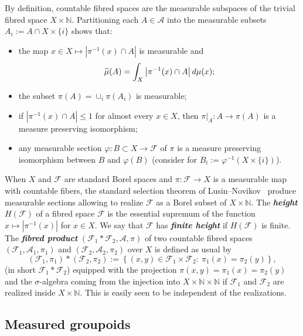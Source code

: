 \documentclass[AHL,Unicode,longabstracts,published]{cedram}
\newcommand{\defin}[1]{\textbf{\emph{#1}}}
\newcommand{\Nmath}{\mathbb{N}}
\newcommand{\cf}{\mathcal{F}}
\newcommand{\ra}{\mathscr{A}}
\newcommand{\ph}{\varphi}
\let\oldtilde\tilde
\renewcommand*{\tilde}[1]{\mathchoice{\widetilde{#1}}{\widetilde{#1}}{\oldtilde{#1}}{\oldtilde{#1}}}
\begin{document}
\begin{rema}\label{rem: count fibred sp. and measurab}
By definition, countable fibred spaces are the measurable subspaces of the trivial fibred space $X \times \Nmath$. Partitioning each $A \in \ra$ into the measurable subsets $A_i:=A\cap X\times\{i\}$ shows that:
\begin{itemize}
\item the map $x \in X\mapsto |\pi^{-1}(x) \cap A|$ is measurable and
\begin{equation}\label{eq: tilde mu on fibred}
\tilde\mu(A)=\int_X\left| \pi^{-1}(x)\cap A\right| d\mu(x);
\end{equation}
\item the subset $\pi(A)=\cup_i \pi(A_i)$ is measurable;
\item if $|\pi^{-1}(x)\cap A|\leq 1$ for almost every $x\in X$, then $\pi\bigr|_A:A\to \pi(A)$ is a measure preserving isomorphism;
\item any measurable section $\ph:B\subset X\to \cf$ of $\pi$ is a measure preserving isomorphism between $B$ and $\ph(B)$ (consider for $B_i:=\ph^{-1} (X\times \{i\})$).
\end{itemize}
\end{rema}


When $X$ and $\cf$ are standard Borel spaces and $\pi \colon \cf \to X$ is a measurable map with countable fibers, the standard selection theorem of Lusin--Novikov~\cite{Lusin-Novikoff-1935} produce measurable sections allowing to realize $\cf$ as a Borel subset of $X \times \Nmath$. The \defin{height} $H(\cf)$ of a fibred space $\cf$ is the essential supremum of the function $x\mapsto |\pi^{-1}(x)|$ for $x\in X$. We say that $\cf$ has
\defin{finite height} if $H(\cf)$ is finite. The
\defin{fibred product} $(\cf_1*\cf_2,\ra,\pi)$ of two countable fibred spaces $(\cf_1,\ra_1,\pi_1)$ and $(\cf_2,\ra_2,\pi_2)$ over $X$ is defined as usual by
\[
(\cf_1,\pi_1)*(\cf_2, \pi_2):=\left\{ (x,y)\in \cf_1\times \cf_2:\ \pi_1(x)=\pi_2(y)\right\},
\]
(in short $\cf_1*\cf_2$) equipped with the projection $\pi(x,y)= \pi_1(x) = \pi_2(y)$ and the $\sigma$-algebra coming from the injection into $X \times\Nmath \times \Nmath$ if $\cf_1$ and $\cf_2$ are realized inside $X \times \Nmath$. This is easily seen to be independent of the realizations.

\subsection{Measured groupoids}
\end{document}
